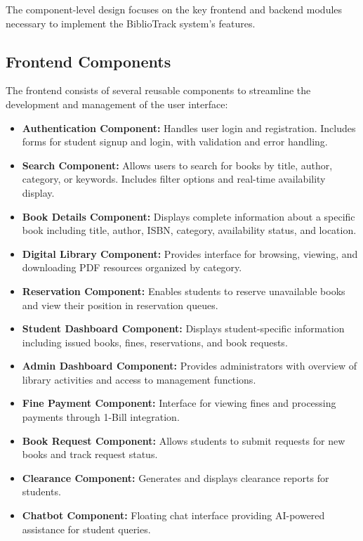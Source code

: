 \documentclass[12pt,a4paper]{report}
\begin{document}
The component-level design focuses on the key frontend and backend modules necessary to implement the BiblioTrack system's features.

\subsection{Frontend Components}

The frontend consists of several reusable components to streamline the development and management of the user interface:

\begin{itemize}
    \item \textbf{Authentication Component:} Handles user login and registration. Includes forms for student signup and login, with validation and error handling.
    
    \item \textbf{Search Component:} Allows users to search for books by title, author, category, or keywords. Includes filter options and real-time availability display.
    
    \item \textbf{Book Details Component:} Displays complete information about a specific book including title, author, ISBN, category, availability status, and location.
    
    \item \textbf{Digital Library Component:} Provides interface for browsing, viewing, and downloading PDF resources organized by category.
    
    \item \textbf{Reservation Component:} Enables students to reserve unavailable books and view their position in reservation queues.
    
    \item \textbf{Student Dashboard Component:} Displays student-specific information including issued books, fines, reservations, and book requests.
    
    \item \textbf{Admin Dashboard Component:} Provides administrators with overview of library activities and access to management functions.
    
    \item \textbf{Fine Payment Component:} Interface for viewing fines and processing payments through 1-Bill integration.
    
    \item \textbf{Book Request Component:} Allows students to submit requests for new books and track request status.
    
    \item \textbf{Clearance Component:} Generates and displays clearance reports for students.
    
    \item \textbf{Chatbot Component:} Floating chat interface providing AI-powered assistance for student queries.
\end{itemize}
\end{document}
